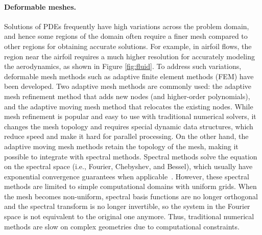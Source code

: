 \documentclass{article}
\newcommand{\aacomment}[1]{\textcolor{red}{{\bf Anima:} #1}}
\begin{document}
\paragraph{Deformable meshes.}
Solutions of PDEs frequently have high variations across the problem domain, and hence some regions of the domain often require a finer mesh compared to other regions for obtaining accurate solutions. For example, in airfoil flows, the region near the airfoil requires a much higher resolution for accurately modeling the aerodynamics, as shown in Figure \ref{fig:fluid}.
To address such variations, deformable mesh methods such as adaptive finite element methods (FEM) have been developed. Two adaptive mesh methods are commonly used: the adaptive mesh refinement method that adds new nodes (and higher-order polynomials), and the adaptive moving mesh method that relocates the existing nodes\cite{babuvska1990p,huang2010adaptive}. 
While mesh refinement is popular and easy to use with traditional numerical solvers, it changes the mesh topology and requires special dynamic data structures, which reduce speed and make it hard for parallel processing. 
On the other hand, the adaptive moving mesh methods retain the topology of the mesh, making it possible to integrate with spectral methods. 
Spectral methods solve the equation on the spectral space (i.e., Fourier, Chebyshev, and Bessel), which usually have exponential convergence guarantees when applicable~\cite{gottlieb1977numerical}. 
However, these spectral methods are limited to simple computational domains with uniform grids. When the mesh becomes non-uniform, spectral basis functions are no longer orthogonal and the spectral transform is no longer invertible, so the system in the Fourier space is not equivalent to the original one anymore. Thus, traditional numerical methods are slow on complex geometries due to computational constraints. 
\end{document}
